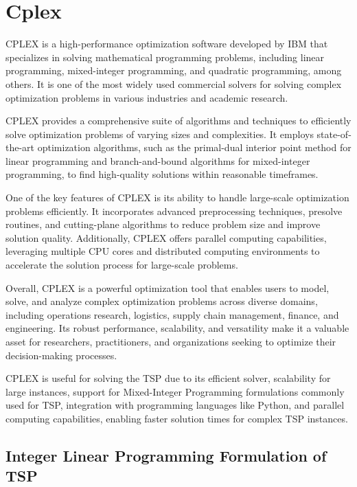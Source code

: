 \chapter{Cplex}

CPLEX is a high-performance optimization software developed by IBM that specializes in solving mathematical programming problems, including linear programming, mixed-integer programming, and quadratic programming, among others. It is one of the most widely used commercial solvers for solving complex optimization problems in various industries and academic research.

CPLEX provides a comprehensive suite of algorithms and techniques to efficiently solve optimization problems of varying sizes and complexities. It employs state-of-the-art optimization algorithms, such as the primal-dual interior point method for linear programming and branch-and-bound algorithms for mixed-integer programming, to find high-quality solutions within reasonable timeframes. 

One of the key features of CPLEX is its ability to handle large-scale optimization problems efficiently. It incorporates advanced preprocessing techniques, presolve routines, and cutting-plane algorithms to reduce problem size and improve solution quality. Additionally, CPLEX offers parallel computing capabilities, leveraging multiple CPU cores and distributed computing environments to accelerate the solution process for large-scale problems.

Overall, CPLEX is a powerful optimization tool that enables users to model, solve, and analyze complex optimization problems across diverse domains, including operations research, logistics, supply chain management, finance, and engineering. Its robust performance, scalability, and versatility make it a valuable asset for researchers, practitioners, and organizations seeking to optimize their decision-making processes.

CPLEX is useful for solving the TSP due to its efficient solver, scalability for large instances, support for Mixed-Integer Programming formulations commonly used for TSP, integration with programming languages like Python, and parallel computing capabilities, enabling faster solution times for complex TSP instances.



\section{Integer Linear Programming Formulation of TSP}

